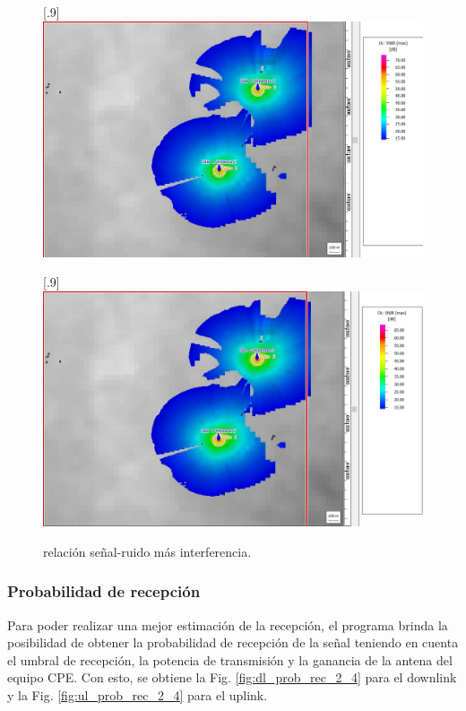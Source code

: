 \documentclass[11pt,a4paper]{article}
\begin{document}
\begin{figure}[ht!]
  \centering
  [.9\linewidth]{\includegraphics[height=14\baselineskip]{fotos_ema/ul_snr_2_4.jpg}}

  [.9\linewidth]{\includegraphics[height=14\baselineskip]{fotos_ema/dl_snr_2_4.jpg}}
  \caption{relación señal-ruido más interferencia.}
  \label{fig:snr_2_4}
\end{figure}



\subsubsection{Probabilidad de recepción}

Para poder realizar una mejor estimación de la recepción, el programa brinda la posibilidad de obtener la probabilidad de recepción de la señal teniendo en cuenta el umbral de recepción, la potencia de transmisión y la ganancia de la antena del equipo CPE. 
Con esto, se obtiene la Fig. \ref{fig:dl_prob_rec_2_4} para el downlink y la Fig. \ref{fig:ul_prob_rec_2_4} para el uplink.
\end{document}

